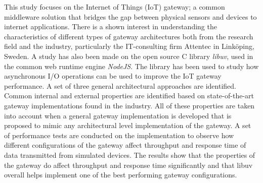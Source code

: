 This study focuses on the Internet of Things (IoT) gateway; a common middleware
solution that bridges the gap between physical sensors and devices to internet
applications. There is a shown interest in understanding the characteristics of
different types of gateway architectures both from the research field and the
industry, particularly the IT-consulting firm Attentec in Linköping, Sweden.  A
study has also been made on the open source C library \textit{libuv}, used in
the common web runtime engine \textit{NodeJS}. The library has been used to
study how asynchronous I/O operations can be used to improve the IoT gateway
performance. A set of three general architectural approaches are identified.
Common internal and external properties are identified based on
state-of-the-art gateway implementations found in the industry. All of these
properties are taken into account when a general gateway implementation is
developed that is proposed to mimic any architectural level implementation of
the gateway. A set of performance tests are conducted on the implementation to
observe how different configurations of the gateway affect throughput and
response time of data transmitted from simulated devices. The results show that
the properties of the gateway do affect throughput and response time
significantly and that libuv overall helps implement one of the best performing
gateway configurations.

